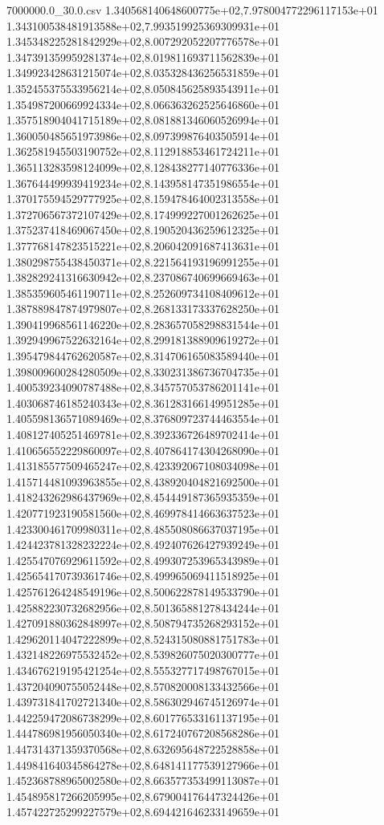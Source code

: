 \begin{filecontents*}{7000000.0_30.0.csv}
1.340568140648600775e+02,7.978004772296117153e+01
1.343100538481913588e+02,7.993519925369309931e+01
1.345348225281842929e+02,8.007292052207776578e+01
1.347391359959281374e+02,8.019811693711562839e+01
1.349923428631215074e+02,8.035328436256531859e+01
1.352455375533956214e+02,8.050845625893543911e+01
1.354987200669924334e+02,8.066363262525646860e+01
1.357518904041715189e+02,8.081881346060526994e+01
1.360050485651973986e+02,8.097399876403505914e+01
1.362581945503190752e+02,8.112918853461724211e+01
1.365113283598124099e+02,8.128438277140776336e+01
1.367644499939419234e+02,8.143958147351986554e+01
1.370175594529777925e+02,8.159478464002313558e+01
1.372706567372107429e+02,8.174999227001262625e+01
1.375237418469067450e+02,8.190520436259612325e+01
1.377768147823515221e+02,8.206042091687413631e+01
1.380298755438450371e+02,8.221564193196991255e+01
1.382829241316630942e+02,8.237086740699669463e+01
1.385359605461190711e+02,8.252609734108409612e+01
1.387889847874979807e+02,8.268133173337628250e+01
1.390419968561146220e+02,8.283657058298831544e+01
1.392949967522632164e+02,8.299181388909619272e+01
1.395479844762620587e+02,8.314706165083589440e+01
1.398009600284280509e+02,8.330231386736704735e+01
1.400539234090787488e+02,8.345757053786201141e+01
1.403068746185240343e+02,8.361283166149951285e+01
1.405598136571089469e+02,8.376809723744463554e+01
1.408127405251469781e+02,8.392336726489702414e+01
1.410656552229860097e+02,8.407864174304268090e+01
1.413185577509465247e+02,8.423392067108034098e+01
1.415714481093963855e+02,8.438920404821692500e+01
1.418243262986437969e+02,8.454449187365935359e+01
1.420771923190581560e+02,8.469978414663637523e+01
1.423300461709980311e+02,8.485508086637037195e+01
1.424423781328232224e+02,8.492407626427939249e+01
1.425547076929611592e+02,8.499307253965343989e+01
1.425654170739361746e+02,8.499965069411518925e+01
1.425761264248549196e+02,8.500622878149533790e+01
1.425882230732682956e+02,8.501365881278434244e+01
1.427091880362848997e+02,8.508794735268293152e+01
1.429620114047222899e+02,8.524315080881751783e+01
1.432148226975532452e+02,8.539826075020300777e+01
1.434676219195421254e+02,8.555327717498767015e+01
1.437204090755052448e+02,8.570820008133432566e+01
1.439731841702721340e+02,8.586302946745126974e+01
1.442259472086738299e+02,8.601776533161137195e+01
1.444786981956050340e+02,8.617240767208568286e+01
1.447314371359370568e+02,8.632695648722528858e+01
1.449841640345864278e+02,8.648141177539127966e+01
1.452368788965002580e+02,8.663577353499113087e+01
1.454895817266205995e+02,8.679004176447324426e+01
1.457422725299227579e+02,8.694421646233149659e+01

\end{filecontents*}
